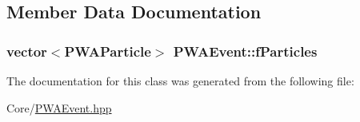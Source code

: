 \subsection{Member Data Documentation}
\hypertarget{classPWAEvent_ad7b1db47d7609bbcd4e5cbffc28c2f9e}{
\subsubsection[{fParticles}]{\setlength{\rightskip}{0pt plus 5cm}vector$<${\bf PWAParticle}$>$ {\bf PWAEvent::fParticles}}}
\label{dc/d66/classPWAEvent_ad7b1db47d7609bbcd4e5cbffc28c2f9e}


The documentation for this class was generated from the following file:\begin{DoxyCompactItemize}
\item 
Core/\hyperlink{PWAEvent_8hpp}{PWAEvent.hpp}\end{DoxyCompactItemize}
